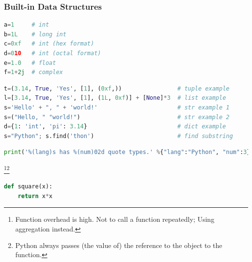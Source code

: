 \begin{frame}[fragile]
  \MyLogo
  \frametitle{Built-in Data Structures}  
\small

\smallskip
{}
\begin{lstlisting}[language=python]
a=1	    # int
b=1L 	# long int
c=0xf	# int (hex format)
d=010	# int (octal format)
e=1.0	# float
f=1+2j	# complex
\end{lstlisting}

\begin{lstlisting}[language=python]
t=(3.14, True, 'Yes', [1], (0xf,))                # tuple example
l=[3.14, True, 'Yes', [1], (1L, 0xf)] + [None]*3  # list example
s='Hello' + ", " + 'world!'                       # str example 1
s=("Hello, " "world!")                            # str example 2
d={1: 'int', 'pi': 3.14}                          # dict example
s="Python"; s.find('thon')                        # find substring
\end{lstlisting}

\begin{lstlisting}[language=python]
print('%(lang)s has %(num)02d quote types.' %{"lang":"Python", "num":3})
\end{lstlisting}

\footnote[frame]{\scriptsize\color{PineGreen}Function overhead is high. Not to call a function repeatedly; Using aggregation instead.}\footnote[frame]{\scriptsize\color{PineGreen}Python always passes (the value of) the reference to the object to the function.}

\begin{lstlisting}[language=python]
def square(x):
	return x*x
\end{lstlisting}

\end{frame}


